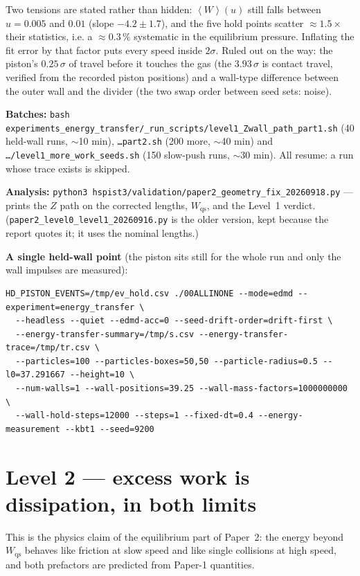 \documentclass[11pt,a4paper]{article}
\newcommand{\avg}[1]{\left\langle #1 \right\rangle}
\newcommand{\cmd}[1]{\texttt{\footnotesize #1}}
\begin{document}
\begin{res}
Two tensions are stated rather than hidden: $\avg W(u)$ still falls between $u = 0.005$ and $0.01$ (slope $-4.2\pm1.7$), and the five hold points scatter $\approx1.5\times$ their statistics, i.e. a $\approx0.3\,\%$ systematic in the equilibrium pressure. Inflating the fit error by that factor puts every speed inside $2\sigma$. Ruled out on the way: the piston's $0.25\,\sigma$ of travel before it touches the gas (the $3.93\,\sigma$ is contact travel, verified from the recorded piston positions) and a wall-type difference between the outer wall and the divider (the two swap order between seed sets: noise).
\end{res}

\begin{howto}
\textbf{Batches:} \cmd{bash experiments\_energy\_transfer/\_run\_scripts/level1\_Zwall\_path\_part1.sh} (40 held-wall runs,
$\sim$10 min), \cmd{\ldots part2.sh} (200 more, $\sim$40 min) and \cmd{\ldots/level1\_more\_work\_seeds.sh}
(150 slow-push runs, $\sim$30 min). All resume: a run whose trace exists is skipped.

\textbf{Analysis:} \cmd{python3 hspist3/validation/paper2\_geometry\_fix\_20260918.py} --- prints the $Z$ path on the
corrected lengths, $W_{\mathrm{qs}}$, and the Level~1 verdict. (\cmd{paper2\_level0\_level1\_20260916.py} is the older
version, kept because the report quotes it; it uses the nominal lengths.)

\textbf{A single held-wall point} (the piston sits still for the whole run and only the wall impulses are measured):
\begin{Verbatim}[fontsize=\scriptsize,frame=single,samepage=true]
HD_PISTON_EVENTS=/tmp/ev_hold.csv ./00ALLINONE --mode=edmd --experiment=energy_transfer \
  --headless --quiet --edmd-acc=0 --seed-drift-order=drift-first \
  --energy-transfer-summary=/tmp/s.csv --energy-transfer-trace=/tmp/tr.csv \
  --particles=100 --particles-boxes=50,50 --particle-radius=0.5 --l0=37.291667 --height=10 \
  --num-walls=1 --wall-positions=39.25 --wall-mass-factors=1000000000 \
  --wall-hold-steps=12000 --steps=1 --fixed-dt=0.4 --energy-measurement --kbt1 --seed=9200
\end{Verbatim}
\end{howto}


\section{Level 2 --- excess work is dissipation, in both limits}

\begin{why}
This is the physics claim of the equilibrium part of Paper~2: the energy beyond $W_{\mathrm{qs}}$ behaves like friction at slow speed and like single collisions at high speed, and both prefactors are predicted from Paper-1 quantities.
\end{why}
\end{document}
